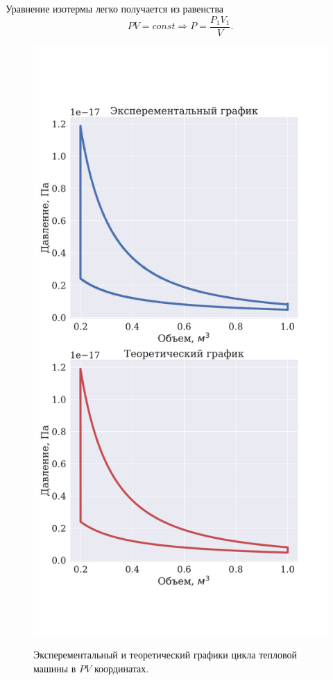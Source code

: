 \documentclass[twoside,twocolumn, 11pt]{article}
\theoremstyle{plain}
\theoremstyle{definition}
\begin{document}
Уравнение изотермы легко получается из равенства
$$PV = const \Rightarrow P = \dfrac{P_1 V_1}{V}.$$
\begin{figure}[!h]
{\includegraphics[width=1\linewidth]{cycle}}
\caption{Эксперементальный и теоретический графики цикла тепловой машины в $PV$ координатах.}
\end{figure}
\end{document}
